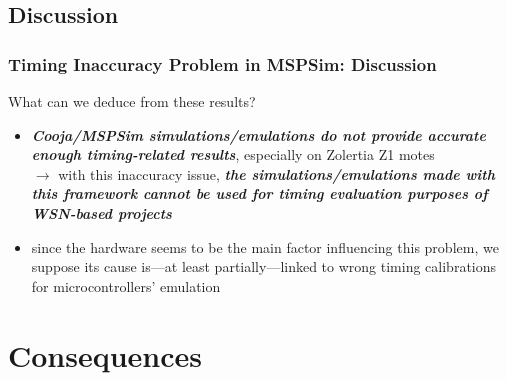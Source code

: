 \documentclass[10pt,c]{beamer}
\renewcommand{\emph}[1]{\textbf{\textit{#1}}}
\begin{document}
\subsection{Discussion}

\begin{frame}
\frametitle{Timing Inaccuracy Problem in MSPSim: Discussion}
\begin{alertblock}{What can we deduce from these results?}
\begin{itemize}
\item \emph{Cooja/MSPSim simulations/emulations do not provide accurate
enough timing-related results}, especially on Zolertia Z1 motes \\
$\rightarrow$ with this inaccuracy issue, \emph{the simulations/emulations
made with this framework cannot be used for timing evaluation purposes
of WSN-based projects}
\item since the hardware seems to be the main factor influencing this
problem, we suppose its cause is---at least partially---linked to wrong
timing calibrations for microcontrollers' emulation \\
\end{itemize}
\end{alertblock}
\end{frame}


\section{Consequences}
\end{document}
